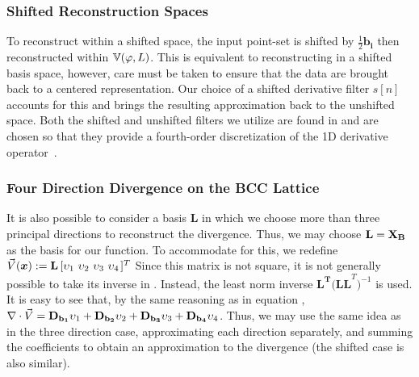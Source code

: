\subsubsection{Shifted Reconstruction Spaces}
To reconstruct within a shifted space, the input point-set is shifted by $\frac{1}{2}\mathbf{b_i}$ then reconstructed within $\mathbb{V}(\varphi, L)$. 
This is equivalent to reconstructing in a shifted basis space, however, care must be taken to ensure that the data are brought back to a centered representation. 
Our choice of a shifted derivative filter $s[n]$ accounts for this and brings the resulting approximation back to the unshifted space. 
Both the shifted and unshifted filters we utilize are found in  and are chosen so that they provide a fourth-order discretization of the 1D derivative operator~\cite{gradrev}. 

\subsubsection{Four Direction Divergence on the BCC Lattice}
It is also possible to consider a basis $\mathbf{L}$ in which we choose more than three principal directions to reconstruct the divergence. 
Thus, we may choose $\mathbf{L} = \mathbf{\mathbf{X}_{B}} $ as the basis for our function. 
To accommodate for this, we redefine $\vec{V}(\vx):=\mathbf{L} \left[\upsilon_1 \ \upsilon_2 \ \upsilon_3 \ \upsilon_4 \right.]^T$ 
Since this matrix is not square, it is not generally possible to take its inverse in . 
Instead, the least norm inverse $\mathbf{L^T(LL}^T\mathbf{)}^{-1}$ is used. 
It is easy to see that, by the same reasoning as in equation , $\nabla \cdot \vec{V} = \mathbf{D}_{\mathbf{b_1}}\upsilon_1 + \mathbf{D}_{\mathbf{b_2}}\upsilon_2 + \mathbf{D}_{\mathbf{b_3}}\upsilon_3 + \mathbf{D}_{\mathbf{b_4}}\upsilon_4$. 
Thus, we may use the same idea as in the three direction case, approximating each direction separately, and summing the coefficients to obtain an approximation to the divergence (the shifted case is also similar).
